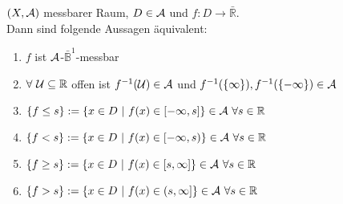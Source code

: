   \begin{lemma}
    $(X, \mathcal{A})$ messbarer Raum, $D \in \mathcal{A}$ und $f: D \to \bar{\mathbb{R}}$.\\
    Dann sind folgende Aussagen äquivalent:
    \begin{enumerate}[label=(\roman*)]
      \item $f$ ist $\mathcal{A}$-$\bar{\mathbb{B}}^1$-messbar
      \item $\forall \ \mathcal{U} \subseteq \mathbb{R}$ offen ist $f^{-1}(\mathcal{U}) \in \mathcal{A}$ und $f^{-1}(\{\infty\}), f^{-1}(\{-\infty\}) \in \mathcal{A}$
      \item $\{f \leq s\} := \{x \in D \ |\ f(x) \in [-\infty, s]\} \in \mathcal{A} \ \forall s \in \mathbb{R}$
      \item $\{f < s\} := \{x \in D \ |\ f(x) \in [-\infty, s)\} \in \mathcal{A} \ \forall s \in \mathbb{R}$
      \item $\{f \geq s\} := \{x \in D \ |\ f(x) \in [s, \infty]\} \in \mathcal{A} \ \forall s \in \mathbb{R}$
      \item $\{f > s\} := \{x \in D \ |\ f(x) \in (s, \infty]\} \in \mathcal{A} \ \forall s \in \mathbb{R}$
    \end{enumerate}
  \end{lemma}

